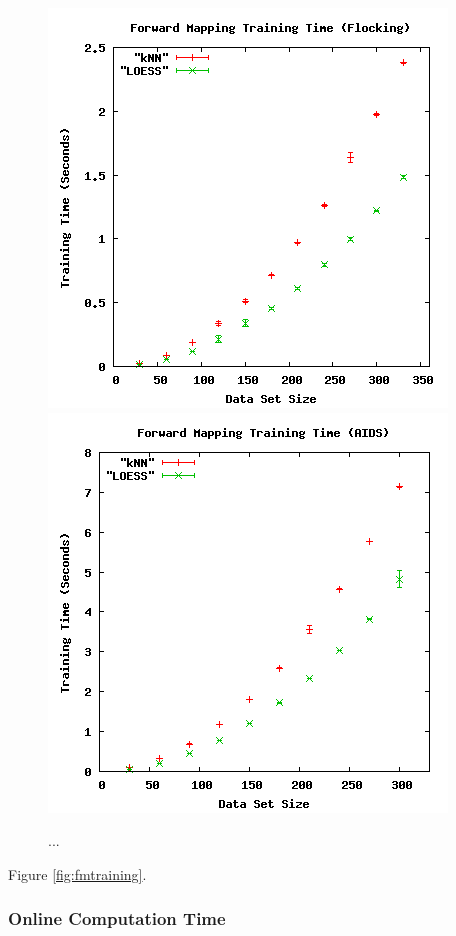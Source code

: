 \begin{figure}[ht]
\centering
\includegraphics[scale=.4]{images/results_flocking/fmtraining.png}
\includegraphics[scale=.4]{images/results_aids/aids-fmtraining.png}
\caption{...}
\label{fig:flockfmtraining}
\end{figure}

Figure \ref{fig:fmtraining}.




  \subsubsection{Online Computation Time}

